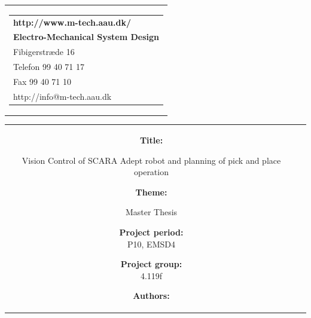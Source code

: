 %
%


\enlargethispage{20em}


\begin{titlepage}
\setcounter{page}{1}
\thispagestyle{plain}
\begin{samepage}
{\samepage 
\begin{tabular}{r}
\parbox{\textwidth}{  
\hfill \parbox{6.7cm}{\begin{tabular}{l}
{\sf\small \textbf{http://www.m-tech.aau.dk/}} \\
{\sf\small  \textbf{Electro-Mechanical System Design}} \\
{\sf\small Fibigerstræde 16} \\
{\sf\small Telefon 99 40 71 17} \\
{\sf\small Fax 99 40 71 10} \\
{\sf\small http://info@m-tech.aau.dk}
\end{tabular}}}
\\
\end{tabular}

\begin{tabular}{cc}
\parbox{7cm}{
\begin{description}

\item {\bf Title:} 

Vision Control of SCARA Adept robot and planning of pick and place operation
  
\item {\bf Theme:} 

Master Thesis 

\end{description}

\parbox{8cm}{

\begin{description}
\item {\bf Project period:}\\
   P10, EMSD4\\
  \hspace{4cm}
\item {\bf Project group:}\\
  4.119f\\
  \hspace{4cm}
\item {\bf Authors:}


\end{description}}}
\end{tabular}}
\end{samepage}
\end{titlepage}

